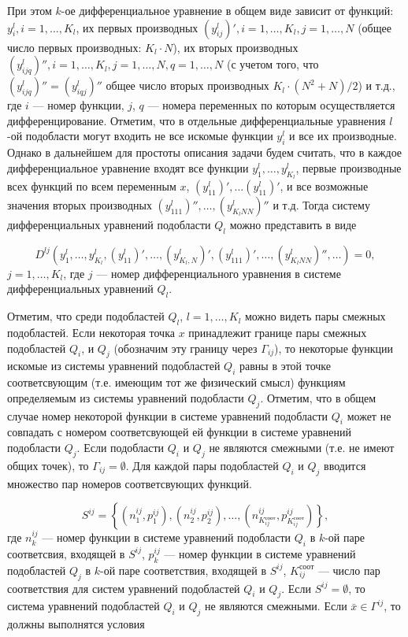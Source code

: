 \documentclass[a4paper,12pt]{article}
\begin{document}
При этом $k$-ое дифференциальное уравнение в общем виде зависит от функций:
$y^l_i, i = 1,\ldots,K_l$, их первых производных $(y^l_{ij})', i =
1,\ldots,K_l, j = 1, \ldots, N$ (общее число первых производных: $K_l \cdot
N$), их вторых производных $(y^l_{ijq})'', i = 1,\ldots,K_l, j =
1,\ldots,N, q = 1,\ldots,N$ (с учетом того, что $(y^l_{ijq})'' =
(y^l_{iqj})''$ общее число вторых производных $K_l \cdot (N^2+N) / 2$) и
т.д., где $i$ --- номер функции, $j$, $q$ --- номера переменных по которым
осуществляется дифференцирование. Отметим, что в отдельные дифференциальные
уравнения $l$-ой подобласти могут входить не все искомые функции $y^l_i$ и
все их производные.  Однако в дальнейшем для простоты описания задачи будем
считать, что в каждое дифференциальное уравнение входят все функции
$y^l_1,\ldots,y^l_{K_l}$, первые производные всех функций по всем
переменным $x$, $(y^l_{11})', \ldots (y^l_{11})'$, и все возможные значения
вторых производных $(y^l_{111})'', \ldots, (y^l_{K_lNN})''$ и т.д. Тогда
систему дифференциальных уравнений подобласти $Q_l$ можно представить в 
виде

\begin{equation}
    D^{lj}(y^l_1,\ldots,y^l_{K_l}, (y^l_{11})',\ldots, (y^l_{K_l,N})',
           (y^l_{111})',\ldots, (y^l_{K_lNN})'',\ldots) = 0,
    \label{pde}
\end{equation}
$j = 1, \ldots, K_l$, где $j$ --- номер дифференциального уравнения в 
системе дифференциальных уравнений $Q_l$.

Отметим, что среди подобластей $Q_l$, $l=1,\ldots,K_l$ можно видеть пары
смежных подобластей. Если некоторая точка $x$ принадлежит границе пары
смежных подобластей $Q_i$, и $Q_j$ (обозначим эту границу через
$\Gamma_{ij}$), то некоторые функции искомые из системы уравнений
подобластей $Q_i$ равны в этой точке соответсвующим (т.е. имеющим тот же
физический смысл) функциям определяемым из системы уравнений подобласти
$Q_j$. Отметим, что в общем случае номер некоторой функции в системе
уравнений подобласти $Q_i$ может не совпадать с номером соответсвующей ей
функции в системе уравнений подобласти $Q_j$. Если подобласти $Q_i$ и $Q_j$
не являются смежными (т.е. не имеют общих точек), то $\Gamma_{ij} =
\emptyset$. Для каждой пары подобластей $Q_i$ и $Q_j$ вводится множество
пар номеров соответсвующих функций.

\begin{equation}
    S^{ij}=\left\{(n^{ij}_1,p^{ij}_1),(n^{ij}_2,p^{ij}_2),
    \ldots,(n^{ij}_{K^{соот}_{ij}},p^{ij}_{K^{соот}_{ij}})\right\},
    \label{set-nums}
\end{equation}
где $n^{ij}_k$ --- номер функции в системе уравнений подобласти $Q_i$
в $k$-ой паре соответсвия, входящей в $S^{ij}$, $p^{ij}_k$ --- номер 
функции в системе уравнений подобластей $Q_j$ в $k$-ой паре соответствия,
входящей в $S^{ij}$, $K^{соот}_{ij}$ --- число пар соответствия для 
систем уравнений подобластей $Q_i$ и $Q_j$. Если $S^{ij} = \emptyset$, то
система уравнений подобластей $Q_i$ и $Q_j$ не являются смежными. Если
$\bar{x} \in \Gamma^{ij}$, то должны выполнятся условия
\end{document}
